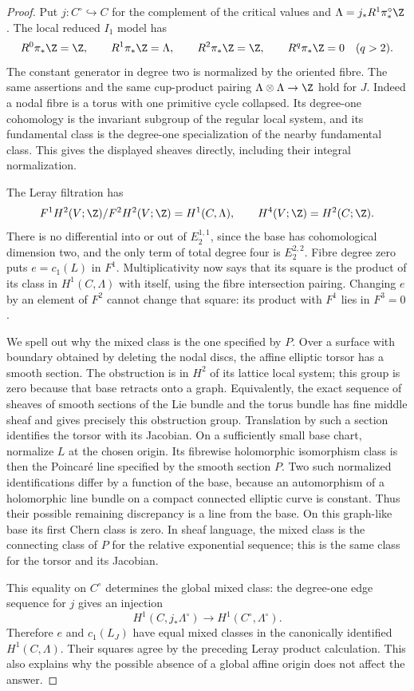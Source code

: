 \begin{proof}
Put $j:C^\circ\hookrightarrow C$ for the complement of the critical
values and $\Lambda=j_*R^1\pi^\circ_*\Z$.  The local reduced $I_1$
model has
\[
 R^0\pi_*\Z=\Z,\qquad R^1\pi_*\Z=\Lambda,
 \qquad R^2\pi_*\Z=\Z,
 \qquad R^q\pi_*\Z=0\quad(q>2).
\]
The constant generator in degree two is normalized by the oriented
fibre.  The same assertions and the same cup-product pairing
$\Lambda\otimes\Lambda\to\Z$ hold for $J$.  Indeed a nodal fibre
is a torus with one primitive cycle collapsed.  Its degree-one
cohomology is the invariant subgroup of the regular local system,
and its fundamental class is the degree-one specialization of the
nearby fundamental class.  This gives the displayed sheaves directly,
including their integral normalization.

The Leray filtration has
\[
 F^1H^2(V;\Z)/F^2H^2(V;\Z)
       =H^1(C,\Lambda),\qquad
 H^4(V;\Z)=H^2(C;\Z).
\]
There is no differential into or out of $E_2^{1,1}$, since the base
has cohomological dimension two, and the only term of total degree
four is $E_2^{2,2}$.  Fibre degree zero puts $e=c_1(L)$ in $F^1$.
Multiplicativity now says that its square is the product of its
class in $H^1(C,\Lambda)$ with itself, using the fibre intersection
pairing.  Changing $e$ by an element of $F^2$ cannot change that
square: its product with $F^1$ lies in $F^3=0$.

We spell out why the mixed class is the one specified by $P$.
Over a surface with boundary obtained by deleting the nodal discs,
the affine elliptic torsor has a smooth section.  The obstruction is
in $H^2$ of its lattice local system; this group is zero because
that base retracts onto a graph.  Equivalently, the exact sequence
of sheaves of smooth sections of the Lie bundle and the torus bundle
has fine middle sheaf and gives precisely this obstruction group.
Translation by such a section identifies the torsor with its
Jacobian.  On a sufficiently small base chart, normalize $L$ at the
chosen origin.  Its fibrewise holomorphic isomorphism class is then
the Poincar\'e line specified by the smooth section $P$.
Two such normalized identifications differ by a function of the
base, because an automorphism of a holomorphic line bundle on a
compact connected elliptic curve is constant.  Thus their possible
remaining discrepancy is a line from the base.  On this graph-like
base its first Chern class is zero.  In sheaf language, the mixed
class is the connecting class of $P$ for the relative exponential
sequence; this is the same class for the torsor and its Jacobian.

This equality on $C^\circ$ determines the global mixed class:
the degree-one edge sequence for $j$ gives an injection
\[
 H^1(C,j_*\Lambda^\circ)
       \longrightarrow H^1(C^\circ,\Lambda^\circ).
\]
Therefore $e$ and $c_1(L_J)$ have equal mixed classes in the
canonically identified $H^1(C,\Lambda)$.  Their squares agree by
the preceding Leray product calculation.  This also explains why
the possible absence of a global affine origin does not affect the
answer.
\end{proof}

